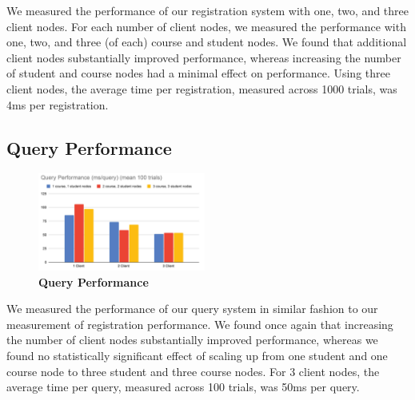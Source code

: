 \documentclass[sigplan, screen, 10pt]{acmart}
\begin{document}
We measured the performance of our registration system with one, two, and three client nodes. For each number of client nodes, we measured the performance with one, two, and three (of each) course and student nodes. We found that additional client nodes substantially improved performance, whereas increasing the number of student and course nodes had a minimal effect on performance. Using three client nodes, the average time per registration, measured across 1000 trials, was 4ms per registration.

\subsection{Query Performance}
\begin{figure}[!htb]
  \centering
  \includegraphics[width=0.49\textwidth]{./figs/queryperformance.png}
  \caption{
    \textbf{Query Performance}
  }
\end{figure}
We measured the performance of our query system in similar fashion to our measurement of registration performance. We found once again that increasing the number of client nodes substantially improved performance, whereas we found no statistically significant effect of scaling up from one student and one course node to three student and three course nodes. For 3 client nodes, the average time per query, measured across 100 trials, was 50ms per query.
\end{document}
